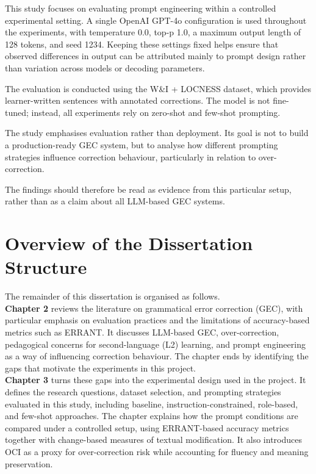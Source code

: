 This study focuses on evaluating prompt engineering within a controlled experimental setting. A single OpenAI GPT-4o configuration is used throughout the experiments, with temperature 0.0, top-p 1.0, a maximum output length of 128 tokens, and seed 1234. Keeping these settings fixed helps ensure that observed differences in output can be attributed mainly to prompt design rather than variation across models or decoding parameters.

The evaluation is conducted using the W\&I + LOCNESS dataset, which provides learner-written sentences with annotated corrections. The model is not fine-tuned; instead, all experiments rely on zero-shot and few-shot prompting.

The study emphasises evaluation rather than deployment. Its goal is not to build a production-ready GEC system, but to analyse how different prompting strategies influence correction behaviour, particularly in relation to over-correction.

The findings should therefore be read as evidence from this particular setup, rather than as a claim about all LLM-based GEC systems.

\section{Overview of the Dissertation Structure}

The remainder of this dissertation is organised as follows.\\

\textbf{Chapter 2} reviews the literature on grammatical error correction (GEC), with particular emphasis on evaluation practices and the limitations of accuracy-based metrics such as ERRANT. It discusses LLM-based GEC, over-correction, pedagogical concerns for second-language (L2) learning, and prompt engineering as a way of influencing correction behaviour. The chapter ends by identifying the gaps that motivate the experiments in this project.\\

\textbf{Chapter 3} turns these gaps into the experimental design used in the project. It defines the research questions, dataset selection, and prompting strategies evaluated in this study, including baseline, instruction-constrained, role-based, and few-shot approaches. The chapter explains how the prompt conditions are compared under a controlled setup, using ERRANT-based accuracy metrics together with change-based measures of textual modification. It also introduces OCI as a proxy for over-correction risk while accounting for fluency and meaning preservation.\\

